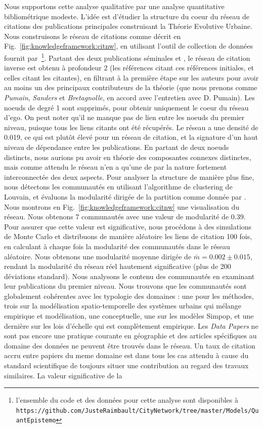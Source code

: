{}{
Nous supportons cette analyse qualitative par une analyse quantitative bibliométrique modeste. L'idée est d'étudier la structure du coeur du réseau de citations des publications principales construisant la Théorie Evolutive Urbaine. Nous construisons le réseau de citations comme décrit en Fig.~\ref{fig:knowledgeframework:citnw}, en utilisant l'outil de collection de données fournit par~\cite{raimbault2016indirect}\footnote{l'ensemble du code et des données pour cette analyse sont disponibles à \\\texttt{https://github.com/JusteRaimbault/CityNetwork/tree/master/Models/QuantEpistemo}}. Partant des deux publications séminales \cite{pumain1997pour} et \cite{sanders1997simpop}, le réseau de citation inverse est obtenu à profondeur 2 (les références citant ces références initiales, et celles citant les citantes), en filtrant à la première étape sur les auteurs pour avoir au moins un des principaux contributeurs de la théorie (que nous prenons comme \emph{Pumain}, \emph{Sanders} et \emph{Bretagnolle}, en accord avec l'entretien avec D. Pumain). Les noeuds de degré 1 sont supprimés, pour obtenir uniquement le coeur du réseau d'ego. On peut noter qu'il ne manque pas de lien entre les noeuds du premier niveau, puisque tous les liens citants ont été récupérés. Le réseau a une densité de 0.019, ce qui est plutôt élevé pour un réseau de citation, et la signature d'un haut niveau de dépendance entre les publications. En partant de deux noeuds distincts, nous aurions pu avoir en théorie des composantes connexes distinctes, mais comme attendu le réseau n'en a qu'une de par la nature fortement interconnectée des deux aspects. Pour analyser la structure de manière plus fine, nous détectons les communautés en utilisant l'algorithme de clustering de Louvain, et évaluons la modularité dirigée de la partition comme donnée par \cite{nicosia2009extending}. Nous montrons en Fig.~\ref{fig:knowledgeframework:citnw} une visualisation du réseau. Nous obtenons 7 communautés avec une valeur de modularité de 0.39. Pour assurer que cette valeur est significative, nous procédons à des simulations de Monte Carlo et distribuons de manière aléatoire les liens de citation 100 fois, en calculant à chaque fois la modularité des communautés dans le réseau aléatoire. Nous obtenons une modularité moyenne dirigée de $\bar{m} = 0.002 \pm 0.015$, rendant la modularité du réseau réel hautement significative (plus de 200 déviations standard). Nous analysons le contenu des communautés en examinant leur publications du premier niveau. Nous trouvons que les communautés sont globalement cohérentes avec les typologie des domaines : une pour les méthodes, trois sur la modélisation spatio-temporelle des systèmes urbains qui mélange empirique et modélisation, une conceptuelle, une sur les modèles Simpop, et une dernière sur les lois d'échelle qui est complètement empirique. Les \emph{Data Papers} ne sont pas encore une pratique courante en géographie et des articles spécifiques au domaine des données ne peuvent être trouvés dans le réseau. Un taux de citation accru entre papiers du meme domaine est dans tous les cas attendu à cause du standard scientifique de toujours situer une contribution au regard des travaux similaires. La valeur significative de la }
